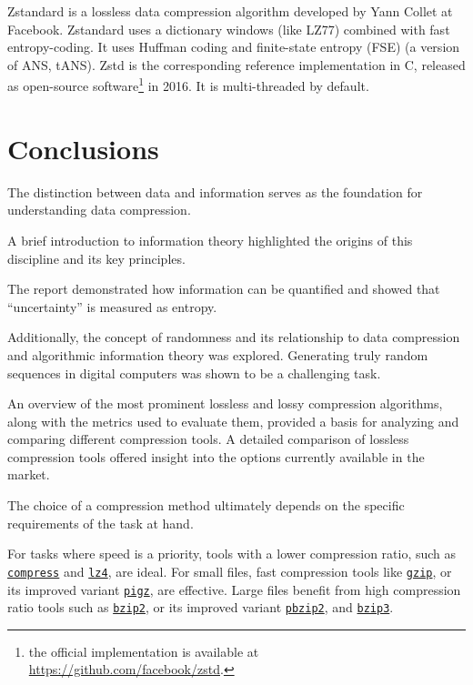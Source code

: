 \documentclass[12pt, a4paper]{report}
\begin{document}
Zstandard is a lossless data compression algorithm developed by Yann Collet at Facebook.
Zstandard uses a dictionary windows (like LZ77) combined with fast entropy-coding.
It uses Huffman coding and finite-state entropy (FSE) (a version of ANS, tANS).
Zstd is the corresponding reference implementation in C, released as open-source software\footnote{the official implementation is
available at \url{https://github.com/facebook/zstd}.} in 2016.
It is multi-threaded by default.

\appendix

\chapter{Conclusions}

The distinction between data and information serves as the foundation for understanding data compression.

A brief introduction to information theory highlighted the origins of this discipline and its key principles.

The report demonstrated how information can be quantified and showed that ``uncertainty'' is measured as entropy.

Additionally, the concept of randomness and its relationship to data compression and algorithmic information theory was explored.
Generating truly random sequences in digital computers was shown to be a challenging task.

An overview of the most prominent lossless and lossy compression algorithms, along with the metrics used to evaluate them,
provided a basis for analyzing and comparing different compression tools.
A detailed comparison of lossless compression tools offered insight into the options currently available in the market.

The choice of a compression method ultimately depends on the specific requirements of the task at hand.

For tasks where speed is a priority, tools with a lower compression ratio, such as \hyperref[subsec:compress]{\texttt{compress}}
and \hyperref[subsec:lz4]{\texttt{lz4}}, are ideal.
For small files, fast compression tools like \hyperref[subsec:gzip]{\texttt{gzip}}, or its improved variant
\hyperref[subsec:gzip]{\texttt{pigz}}, are effective.
Large files benefit from high compression ratio tools such as \hyperref[subsec:bzip2]{\texttt{bzip2}}, or its improved variant
\hyperref[subsec:bzip2]{\texttt{pbzip2}}, and \hyperref[subsec:bzip3]{\texttt{bzip3}}.
\end{document}
